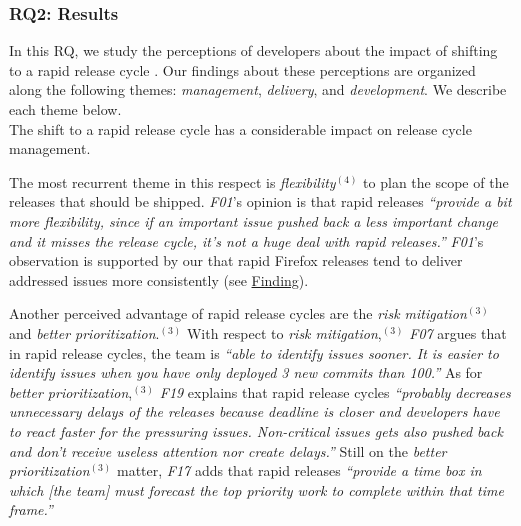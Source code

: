 \subsubsection*{RQ2: Results}

In this RQ, we study the perceptions of developers about the impact of shifting
to a rapid release cycle \DIFaddbegin {}\DIFaddend . Our findings about
these perceptions are organized along the following themes: {\em management},
{\em delivery}, and {\em development}. We describe each theme below.\\    

\noindent\DIFdelbegin %
\textit{\textbf{}%
}%
\DIFdelend \DIFaddbegin {} \DIFaddend The shift to a rapid
release cycle has a considerable impact on release cycle management. 

The most recurrent theme in this respect is {\em flexibility}$^{(4)}$ to plan
the scope of the releases that should be shipped.  {\em F01}'s opinion is that
rapid releases {\em ``provide a bit more flexibility, since if an important
issue pushed back a less important change and it misses the release cycle, it's
not a huge deal with rapid releases.''} {\em F01}'s observation is supported by
our \DIFdelbegin {}\DIFdelend \DIFaddbegin {}\DIFaddend that rapid Firefox releases tend to deliver addressed issues
more consistently (see \DIFdelbegin %
\DIFdel{~\ref{obs:2}}\DIFdelend \DIFaddbegin \hyperref[find18]{Finding}\DIFadd{~\ref{find18}}\DIFaddend ). 

Another perceived advantage of rapid release cycles are the {\em risk
mitigation}$^{(3)}$ and {\em better prioritization}.$^{(3)}$ With respect to
{\em risk mitigation},$^{(3)}$ {\em F07} argues that in rapid release cycles,
the team is {\em ``able to identify issues sooner. It is easier to identify
issues when you have only deployed 3 new commits than 100.''} As for {\em better
prioritization},$^{(3)}$ {\em F19} explains that rapid release cycles {\em
``probably decreases unnecessary delays of the releases because deadline is
closer and developers have to react faster for the pressuring issues.
Non-critical issues gets also pushed back and don't receive useless attention
nor create delays.''} Still on the {\em better prioritization}$^{(3)}$ matter,
{\em F17} adds that rapid releases {\em ``provide a time box in which [the team]
must forecast the top priority work to complete within that time frame.'' }\\

